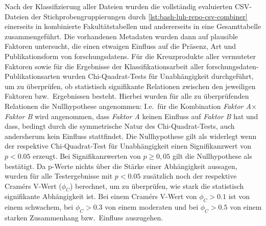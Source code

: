 Nach der Klassifizierung aller Dateien wurden die vollständig evaluierten CSV-Dateien der Stichprobengruppierungen durch \cref{lst:bash-luh-repo-csv-combiner} einerseits in kombinierte Fakultätstabellen und andererseits in eine Gesamttabelle zusammengeführt.
Die vorhandenen Metadaten wurden dann auf plausible Faktoren untersucht, die einen etwaigen Einfluss auf die Präsenz, Art und Publikationsform von \glspl{forschungsdaten}.
Für die Kreuzprodukte aller vermuteter Faktoren sowie für die Ergebnisse der Klassifikationsarbeit aller \gls{forschungsdaten}-Publikationsarten wurden Chi-Quadrat-Tests für Unabhängigkeit durchgeführt, um zu überprüfen, ob statistisch signifikante Relationen zwischen den jeweiligen Faktoren bzw.~Ergebnissen besteht.
Hierbei wurden für alle zu überprüfenden Relationen die Nullhypothese angenommen:
I.e.~für die Kombination \textit{Faktor A}$\times$\textit{Faktor B} wird angenommen, dass \textit{Faktor A} keinen Einfluss auf \textit{Faktor B} hat und dass, bedingt durch die symmetrische Natur des Chi-Quadrat-Tests, auch andersherum kein Einfluss stattfindet.
Die Nullhypothese gilt als widerlegt wenn der respektive Chi-Quadrat-Test für Unabhängigkeit einen Signifikanzwert von $p<\num{0,05}$ erzeugt.
Bei Signifikanzwerten von $p\geqslant0,05$ gilt die Nullhypothese als bestätigt.
Da p-Werte nichts über die Stärke einer Abhängigkeit aussagen, wurden für alle Testergebnisse mit $p<\num{0,05}$ zusätzlich noch der respektive Cramérs V-Wert ($\phi_C$) berechnet, um zu überprüfen, wie stark die statistisch signifikante Abhängigkeit ist.
Bei einem Cramérs V-Wert von $\phi_C>\num{0,1}$ ist von einem schwachem, bei $\phi_C>\num{0,3}$ von einem moderaten und bei $\phi_C>\num{0,5}$ von einem starken Zusammenhang bzw.~Einfluss auszugehen.

